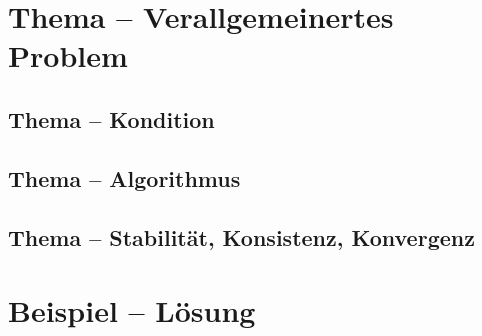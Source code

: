 \documentclass{beamer}
\begin{document}
\section{Thema -- Verallgemeinertes Problem}

\subsection{Thema -- Kondition}

\subsection{Thema -- Algorithmus}

\subsection{Thema -- Stabilität, Konsistenz, Konvergenz}

\section{Beispiel -- Lösung}

















\end{document}
